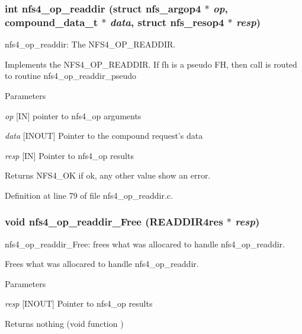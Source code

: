 \subsubsection[{nfs4\_\-op\_\-readdir}]{\setlength{\rightskip}{0pt plus 5cm}int nfs4\_\-op\_\-readdir (struct nfs\_\-argop4 $\ast$ {\em op}, \/  compound\_\-data\_\-t $\ast$ {\em data}, \/  struct nfs\_\-resop4 $\ast$ {\em resp})}\label{nfs4__op__readdir_8c_a6635db351f8362a123052e09739f8d29}
nfs4\_\-op\_\-readdir: The NFS4\_\-OP\_\-READDIR.

Implements the NFS4\_\-OP\_\-READDIR. If fh is a pseudo FH, then call is routed to routine nfs4\_\-op\_\-readdir\_\-pseudo


\begin{DoxyParams}{Parameters}
\item[{\em op}][IN] pointer to nfs4\_\-op arguments \item[{\em data}][INOUT] Pointer to the compound request's data \item[{\em resp}][IN] Pointer to nfs4\_\-op results\end{DoxyParams}
\begin{DoxyReturn}{Returns}
NFS4\_\-OK if ok, any other value show an error. 
\end{DoxyReturn}


Definition at line 79 of file nfs4\_\-op\_\-readdir.c.
\subsubsection[{nfs4\_\-op\_\-readdir\_\-Free}]{\setlength{\rightskip}{0pt plus 5cm}void nfs4\_\-op\_\-readdir\_\-Free (READDIR4res $\ast$ {\em resp})}\label{nfs4__op__readdir_8c_a28bd74099667237874d6ec1103df378f}
nfs4\_\-op\_\-readdir\_\-Free: frees what was allocared to handle nfs4\_\-op\_\-readdir.

Frees what was allocared to handle nfs4\_\-op\_\-readdir.


\begin{DoxyParams}{Parameters}
\item[{\em resp}][INOUT] Pointer to nfs4\_\-op results\end{DoxyParams}
\begin{DoxyReturn}{Returns}
nothing (void function ) 
\end{DoxyReturn}


